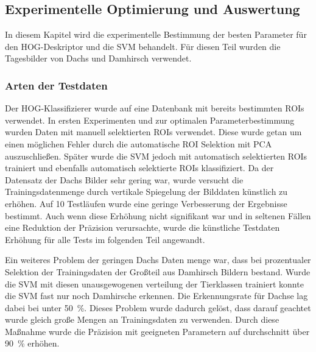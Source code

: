 \subsection{Experimentelle Optimierung und Auswertung} \label{sec:HOG_parameter_and_results}
In diesem Kapitel wird die experimentelle Bestimmung der besten Parameter für den HOG-Deskriptor und die SVM behandelt. Für diesen Teil wurden die Tagesbilder von Dachs und Damhirsch verwendet.


\subsubsection{Arten der Testdaten} \label{sssec:test_data_HOG}
Der HOG-Klassifizierer wurde auf eine Datenbank mit bereits bestimmten ROIs verwendet. In ersten Experimenten und zur optimalen Parameterbestimmung wurden Daten mit manuell selektierten ROIs verwendet. Diese wurde getan um einen möglichen Fehler durch die automatische ROI Selektion mit PCA auszuschließen. Später wurde die SVM jedoch mit automatisch selektierten ROIs trainiert und ebenfalls automatisch selektierte ROIs klassifiziert. 
Da der Datensatz der Dachs Bilder sehr gering war, wurde versucht die Trainingsdatenmenge durch vertikale Spiegelung der Bilddaten künstlich zu erhöhen. Auf 10 Testläufen wurde eine geringe Verbesserung der Ergebnisse bestimmt. Auch wenn diese Erhöhung nicht signifikant war und in seltenen Fällen eine Reduktion der Präzision verursachte, wurde die künstliche Testdaten Erhöhung für alle Tests im folgenden Teil angewandt. 

Ein weiteres Problem der geringen Dachs Daten menge war, dass bei prozentualer Selektion der Trainingsdaten der Großteil aus Damhirsch Bildern bestand. Wurde die SVM mit diesen unausgewogenen verteilung der Tierklassen trainiert konnte die SVM fast nur noch Damhirsche erkennen. Die Erkennungsrate für Dachse lag dabei bei unter 50~\%. Dieses Problem wurde dadurch gelöst, dass darauf geachtet wurde gleich große Mengen an Trainingsdaten zu verwenden. Durch diese Maßnahme wurde die Präzision mit geeigneten Parametern auf durchschnitt über 90~\% erhöhen.

